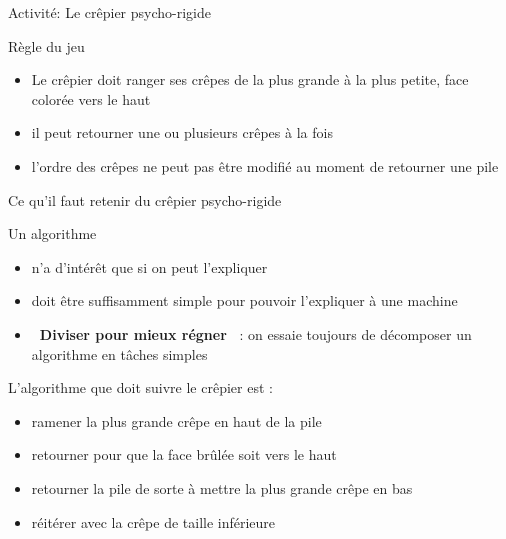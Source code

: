 \documentclass[final,hyperref={pdfpagelabels=false}]{beamer}
\renewenvironment{Coupe}{   }{   }
\begin{document}
\begin{Coupe}
\begin{frame}{Activité: Le crêpier psycho-rigide}
  \begin{block}{Règle du jeu}
    \begin{itemize}
    \item Le crêpier doit ranger ses crêpes de la plus grande à la plus petite,
      face colorée vers le haut
    \item il peut retourner une ou plusieurs crêpes à la fois
    \item l'ordre des crêpes ne peut pas être modifié au moment de retourner
      une pile
    \end{itemize}
  \end{block}

\end{frame}
\begin{frame}{Ce qu'il faut retenir du  crêpier psycho-rigide}

  \begin{block}{Un algorithme}
    \begin{itemize}
    \item n'a d'intérêt que si on peut l'expliquer
    \item doit être suffisamment simple pour pouvoir l'expliquer à une machine
    \item \alert{\textbf{\og~Diviser pour mieux régner~\fg}} : on essaie
    toujours de décomposer un algorithme en tâches simples
    \end{itemize}
  \end{block}

  \begin{block}{L'algorithme que doit suivre le crêpier est :}
    \begin{itemize}
    \item ramener la plus grande crêpe en haut de la pile
    \item retourner pour que la face brûlée soit vers le haut
    \item retourner la pile de sorte à mettre la plus grande crêpe en bas
    \item réitérer avec la crêpe de taille inférieure
    \end{itemize}
  \end{block}


\end{frame}
\end{Coupe}
\end{document}
